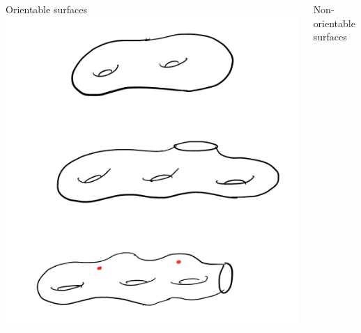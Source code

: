 \begin{frame}
\begin{columns}
\begin{column}{0.5\textwidth}
  \begin{center}
    Orientable surfaces \\
    \includegraphics[scale=0.15]{orientable.png}
  \end{center}
\end{column}
\pause
\begin{column}{0.5\textwidth}  %
    \begin{center}
      Non-orientable surfaces

\end{center}
\end{column}
\end{columns}
\end{frame}
